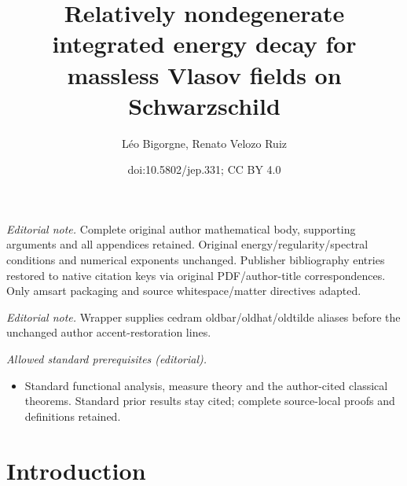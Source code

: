 \documentclass[10pt]{amsart}
\title{Relatively nondegenerate integrated energy decay for massless Vlasov fields on Schwarzschild}
\author{Léo Bigorgne, Renato Velozo Ruiz}
\date{doi:10.5802/jep.331; CC BY 4.0}
\theoremstyle{plain}
\theoremstyle{definition}
\begin{document}
\maketitle
\noindent\textit{Editorial note.} Complete original author mathematical body, supporting arguments and all appendices retained. Original energy/regularity/spectral conditions and numerical exponents unchanged. Publisher bibliography entries restored to native citation keys via original PDF/author-title correspondences. Only amsart packaging and source whitespace/matter directives adapted.\par\medskip
\noindent\textit{Editorial note.} Wrapper supplies cedram oldbar/oldhat/oldtilde aliases before the unchanged author accent-restoration lines.\par\medskip
\noindent\textit{Allowed standard prerequisites (editorial).}\begin{itemize}
\item Standard functional analysis, measure theory and the author-cited classical theorems. Standard prior results stay cited; complete source-local proofs and definitions retained.
\end{itemize}\medskip
\vspace*{-\baselineskip}
\tableofcontents


\section{Introduction}
\end{document}
